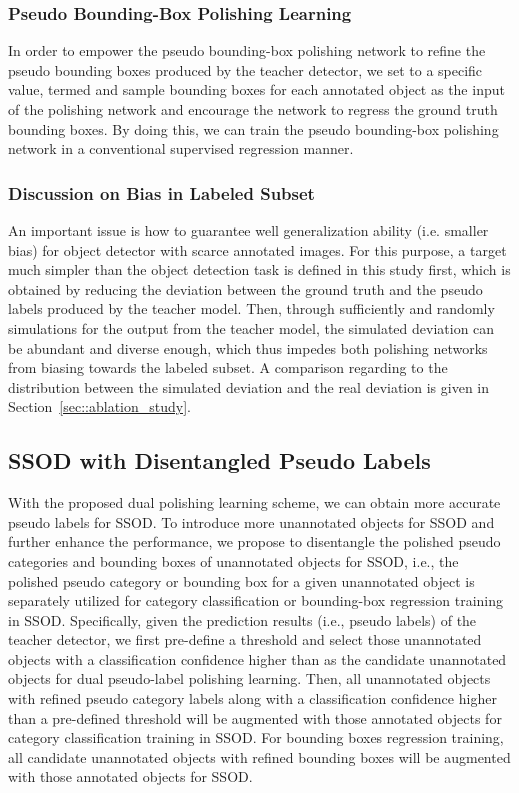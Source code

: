 \documentclass[letterpaper]{article} \usepackage{aaai23}  \usepackage{times}  \usepackage{helvet}  \usepackage{courier}  \usepackage[hyphens]{url}  \usepackage{graphicx} \urlstyle{rm} \def\UrlFont{\rm}  \usepackage{natbib}  \usepackage{caption} \frenchspacing  \setlength{\pdfpagewidth}{8.5in}  \setlength{\pdfpageheight}{11in}  \usepackage{algorithm}
\begin{document}
\subsubsection{\textbf{Pseudo Bounding-Box Polishing Learning}} In order to empower the pseudo bounding-box polishing network to refine the pseudo bounding boxes produced by the teacher detector, we set  to a specific value, termed  and sample  bounding boxes for each annotated object as the input of the polishing network and encourage the network to regress the ground truth bounding boxes. By doing this, we can train the pseudo bounding-box polishing network in a conventional supervised regression manner.


\subsubsection{\textbf{Discussion on Bias in Labeled Subset}}
An important issue is how to guarantee well generalization ability (i.e. smaller bias) for object detector with scarce annotated images. For this purpose, a target much simpler than the object detection task is defined in this study first, which is obtained by reducing the deviation between the ground truth and the pseudo labels produced by the teacher model. 
Then, through sufficiently and randomly simulations for the output from the teacher model, the simulated deviation can be abundant and diverse enough, which thus impedes both polishing networks from biasing towards the labeled subset. 
A comparison regarding to the distribution between the simulated deviation and the real deviation is given in Section~\ref{sec::ablation_study}.

\subsection{SSOD with Disentangled Pseudo Labels}
With the proposed dual polishing learning scheme, we can obtain more accurate pseudo labels for SSOD. To introduce more unannotated objects for SSOD and further enhance the performance, we propose to disentangle the polished pseudo categories and bounding boxes of unannotated objects for SSOD, i.e., the polished pseudo category or bounding box for a given unannotated object is separately utilized for category classification or bounding-box regression training in SSOD. Specifically, given the prediction results (i.e., pseudo labels) of the teacher detector, we first pre-define a threshold  and select those unannotated objects with a classification confidence higher than  as the candidate unannotated objects for dual pseudo-label polishing learning. Then, all unannotated objects with refined pseudo category labels along with a classification confidence higher than a pre-defined threshold  will be augmented with those annotated objects for category classification training in SSOD. For bounding boxes regression training, all candidate unannotated objects with refined bounding boxes will be augmented with those annotated objects for SSOD.
\end{document}
